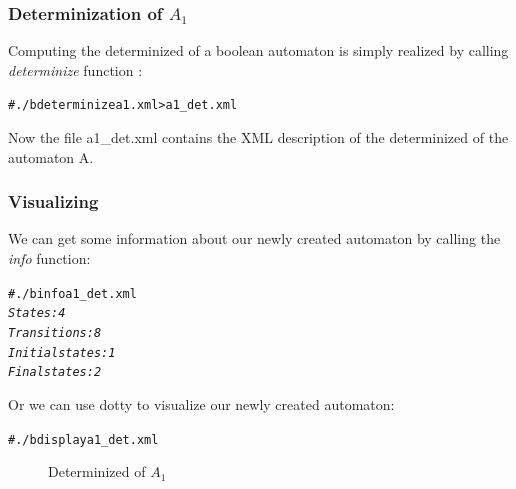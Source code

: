 \subsubsection{Determinization of $A_1$}
Computing the determinized of a boolean automaton is simply realized
by calling \textit{determinize} function :
\begin{alltt}
# ./b determinize a1.xml > a1\_det.xml
\end{alltt}
Now the file a1\_det.xml contains the XML description of the
determinized of the automaton A.

\subsubsection{Visualizing}

We can get some information about our newly created automaton by calling
the \textit{info} function:
\begin{alltt}
# ./b info a1\_det.xml
\textit{States: 4
Transitions: 8
Initial states: 1
Final states: 2}
\end{alltt}
Or we can use dotty to visualize our newly created automaton:
\begin{alltt}
# ./b display a1\_det.xml
\end{alltt}

\begin{figure}[ht]
  \centering
  \caption{Determinized of $A_1$}
\end{figure}

